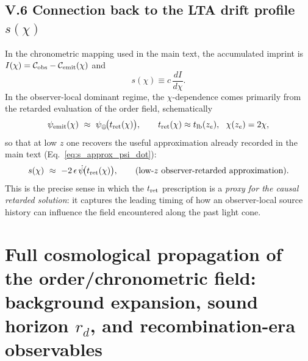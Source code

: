 \documentclass[10pt]{article}
\newcommand{\chis}{\chi}
\newcommand{\tlb}{t_{\mathrm{lb}}}
\begin{document}
\subsection{V.6 Connection back to the LTA drift profile $s(\chis)$}
\label{app:tret_green:to_s}

In the chronometric mapping used in the main text, the accumulated imprint is
$I(\chis)=\mathcal{C}_{\rm obs}-\mathcal{C}_{\rm emit}(\chis)$ and
\begin{equation}
s(\chis)\equiv c\,\frac{dI}{d\chis}.
\end{equation}
In the observer-local dominant regime, the $\chis$-dependence comes primarily from the retarded
evaluation of the order field, schematically
\begin{equation}
\psi_{\rm emit}(\chis)\ \approx\ \psi_\oplus\!\bigl(t_{\rm ret}(\chis)\bigr),
\qquad
t_{\rm ret}(\chis)\approx \tlb(z_e),\ \ \chis(z_e)=2\chis,
\end{equation}
so that at low $z$ one recovers the useful approximation already recorded in the main text
(Eq.~\eqref{eq:s_approx_psi_dot}):
\begin{equation}
s(\chis)\ \approx\ -2\,\epsilon\,\dot\psi\!\bigl(t_{\rm ret}(\chis)\bigr),
\qquad (\text{low-$z$ observer-retarded approximation}).
\end{equation}
This is the precise sense in which the $t_{\rm ret}$ prescription is a \emph{proxy for the causal
retarded solution}: it captures the leading timing of how an observer-local source history can
influence the field encountered along the past light cone.



\section{Full cosmological propagation of the order/chronometric field:
background expansion, sound horizon $r_d$, and recombination-era observables}
\label{app:early_universe_full}
\end{document}
